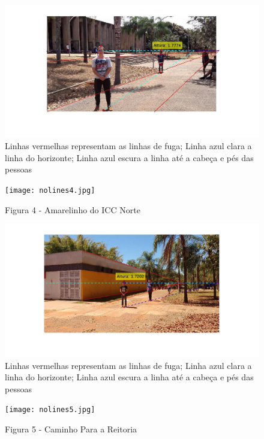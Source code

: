 \documentclass[a4paper, 12pt]{article}
\begin{document}
    \begin{figure}[H]
		\centering
		\includegraphics[width=0.95\linewidth]{lines3.jpg}
		\caption{Linhas vermelhas representam as linhas de fuga; Linha azul clara a linha do horizonte; Linha azul escura a linha até a cabeça e pés das pessoas}
	\end{figure}

    \begin{figure}[H]
		\centering
		\texttt{[image: nolines4.jpg]}
		\caption{Figura 4 - Amarelinho do ICC Norte}
	\end{figure}

    \begin{figure}[H]
		\centering
		\includegraphics[width=0.95\linewidth]{lines4.jpg}
		\caption{Linhas vermelhas representam as linhas de fuga; Linha azul clara a linha do horizonte; Linha azul escura a linha até a cabeça e pés das pessoas}
	\end{figure}

    \begin{figure}[H]
        \centering
        \texttt{[image: nolines5.jpg]}
        \caption{Figura 5 - Caminho Para a Reitoria}
    \end{figure}
\end{document}
